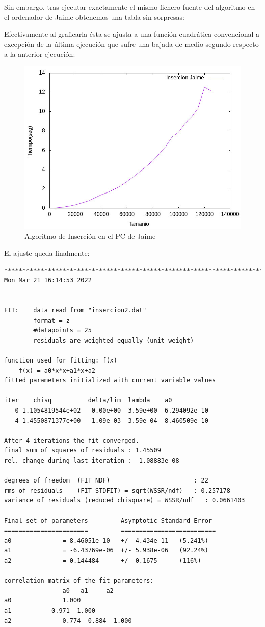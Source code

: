 \documentclass[12pt, spanish]{article}
\begin{document}
Sin embargo, tras ejecutar exactamente el mismo fichero fuente del algoritmo en el ordenador de Jaime obtenemos una tabla sin sorpresas:


Efectivamente al graficarla ésta se ajusta a una función cuadrática convencional a excepción de la última ejecución que sufre una bajada de medio segundo respecto a la anterior ejecución:
\begin{figure}[H]
  \centering
  \includegraphics[scale = 0.8]{insercionJaime.png}
  \caption{Algoritmo de Inserción en el PC de Jaime}
\end{figure}

El ajuste queda finalmente:

\begin{verbatim}
************************************************************************
Mon Mar 21 16:14:53 2022


FIT:	data read from "insercion2.dat"
    	format = z
    	#datapoints = 25
    	residuals are weighted equally (unit weight)

function used for fitting: f(x)
    f(x) = a0*x*x+a1*x+a2
fitted parameters initialized with current variable values

iter  	chisq          delta/lim  lambda    a0
   0 1.1054819544e+02   0.00e+00  3.59e+00	6.294092e-10
   4 1.4550871377e+00  -1.09e-03  3.59e-04	8.460509e-10

After 4 iterations the fit converged.
final sum of squares of residuals : 1.45509
rel. change during last iteration : -1.08883e-08

degrees of freedom	(FIT_NDF)                    	: 22
rms of residuals  	(FIT_STDFIT) = sqrt(WSSR/ndf)	: 0.257178
variance of residuals (reduced chisquare) = WSSR/ndf   : 0.0661403

Final set of parameters        	Asymptotic Standard Error
=======================        	==========================
a0          	= 8.46051e-10  	+/- 4.434e-11	(5.241%)
a1          	= -6.43769e-06 	+/- 5.938e-06	(92.24%)
a2          	= 0.144484     	+/- 0.1675   	(116%)

correlation matrix of the fit parameters:
            	a0   a1 	a2
a0          	1.000
a1         	-0.971  1.000
a2          	0.774 -0.884  1.000
\end{verbatim}
\end{document}
